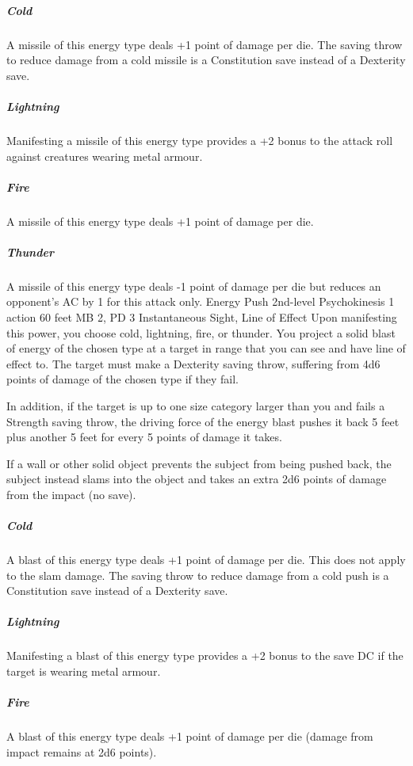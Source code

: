\subparagraph{Cold} A missile of this energy type deals +1
point of damage per die. The saving throw to reduce damage
from a cold missile is a Constitution save instead of a Dexterity
save.

\subparagraph{Lightning} Manifesting a missile of this energy
type provides a +2 bonus to the attack roll against creatures
wearing metal armour.

\subparagraph{Fire} A missile of this energy type deals +1
point of damage per die.

\subparagraph{Thunder} A missile of this energy type deals
-1 point of damage per die but reduces an opponent's AC by
1 for this attack only.
\DndPowerHeader%
    {Energy Push\label{pwr:energy_push}}
    {2nd-level Psychokinesis}
    {1 action}
    {60 feet}
    {MB 2, PD 3}
    {Instantaneous}
    {Sight, Line of Effect}
Upon manifesting this power, you choose cold,
lightning, fire, or thunder. You project a solid blast of
energy of the chosen type at a target in range that you
can see and have line of effect to. The target must make
a Dexterity saving throw, suffering from 4d6 points of damage
of the chosen type if they fail.

In addition, if the target is
up to one size category larger than you and fails a Strength
saving throw, the driving force of the energy blast pushes
it back 5 feet plus another 5 feet for every 5 points of
damage it takes.

If a wall or other solid object prevents
the subject from being pushed back, the subject instead
slams into the object and takes an extra 2d6 points of damage
from the impact (no save).

\subparagraph{Cold}
A blast of this energy type
deals +1 point of damage per die.
This does not apply to the slam damage.
The saving throw to reduce damage from a cold push
is a Constitution save instead of a Dexterity save.

\subparagraph{Lightning}
Manifesting a blast of this energy type provides a +2 bonus
to the save DC if the target is wearing metal armour.

\subparagraph{Fire}
A blast of this energy type deals +1
point of damage per die (damage from impact remains at
2d6 points).


